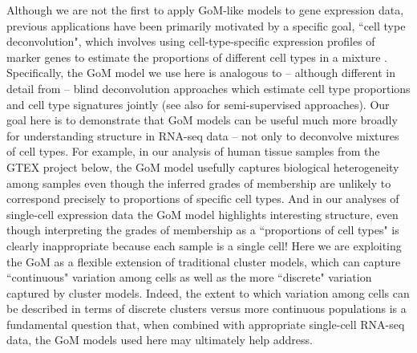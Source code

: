 
Although we are not the first to apply GoM-like models to gene expression data, previous applications
have been primarily motivated by a specific goal, ``cell type deconvolution", which involves  
using cell-type-specific expression profiles of marker genes to estimate the proportions of different cell types in a mixture \cite{Lindsay2013}. 
Specifically, the GoM model we use here is analogous to -- although different in detail from -- 
blind deconvolution approaches \cite{Schwartz2010,Repsilber2010}
 which estimate cell type proportions and cell type signatures jointly (see also \cite{Shen-Orr2010,Qiao2012} for semi-supervised approaches). 
Our goal here is to demonstrate that GoM models can be useful much more broadly
for understanding structure in RNA-seq data -- not only to deconvolve 
mixtures of cell types. For example, in our analysis of human tissue samples from the GTEX project below, the GoM model
usefully captures biological heterogeneity among samples even though the inferred grades of
membership are unlikely to correspond precisely to proportions of specific cell types.
And in our analyses of single-cell expression data the GoM model highlights interesting
structure, even though interpreting the grades of membership as a ``proportions of cell types" is clearly inappropriate because each sample is a single cell!
Here we are exploiting the GoM as a flexible extension of traditional cluster models, 
which can capture ``continuous" variation among cells as well as the more ``discrete" variation captured by cluster models. 
Indeed, the extent to which variation among cells can be described in terms of discrete clusters versus more continuous populations
is a fundamental question that, when combined with appropriate single-cell RNA-seq data, the GoM models used here may
ultimately help address.

 
